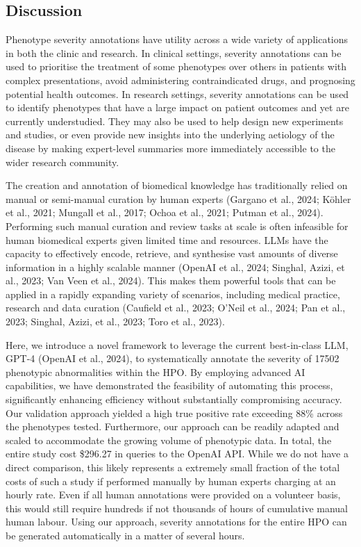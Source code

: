 \documentclass[
]{agujournal2019}
\begin{document}
\subsection{Discussion}\label{discussion}

Phenotype severity annotations have utility across a wide variety of
applications in both the clinic and research. In clinical settings,
severity annotations can be used to prioritise the treatment of some
phenotypes over others in patients with complex presentations, avoid
administering contraindicated drugs, and prognosing potential health
outcomes. In research settings, severity annotations can be used to
identify phenotypes that have a large impact on patient outcomes and yet
are currently understudied. They may also be used to help design new
experiments and studies, or even provide new insights into the
underlying aetiology of the disease by making expert-level summaries
more immediately accessible to the wider research community.

The creation and annotation of biomedical knowledge has traditionally
relied on manual or semi-manual curation by human experts (Gargano et
al., 2024; Köhler et al., 2021; Mungall et al., 2017; Ochoa et al.,
2021; Putman et al., 2024). Performing such manual curation and review
tasks at scale is often infeasible for human biomedical experts given
limited time and resources. LLMs have the capacity to effectively
encode, retrieve, and synthesise vast amounts of diverse information in
a highly scalable manner (OpenAI et al., 2024; Singhal, Azizi, et al.,
2023; Van Veen et al., 2024). This makes them powerful tools that can be
applied in a rapidly expanding variety of scenarios, including medical
practice, research and data curation (Caufield et al., 2023; O'Neil et
al., 2024; Pan et al., 2023; Singhal, Azizi, et al., 2023; Toro et al.,
2023).

Here, we introduce a novel framework to leverage the current
best-in-class LLM, GPT-4 (OpenAI et al., 2024), to systematically
annotate the severity of 17502 phenotypic abnormalities within the HPO.
By employing advanced AI capabilities, we have demonstrated the
feasibility of automating this process, significantly enhancing
efficiency without substantially compromising accuracy. Our validation
approach yielded a high true positive rate exceeding 88\% across the
phenotypes tested. Furthermore, our approach can be readily adapted and
scaled to accommodate the growing volume of phenotypic data. In total,
the entire study cost \$296.27 in queries to the OpenAI API. While we do
not have a direct comparison, this likely represents a extremely small
fraction of the total costs of such a study if performed manually by
human experts charging at an hourly rate. Even if all human annotations
were provided on a volunteer basis, this would still require hundreds if
not thousands of hours of cumulative manual human labour. Using our
approach, severity annotations for the entire HPO can be generated
automatically in a matter of several hours.
\end{document}
